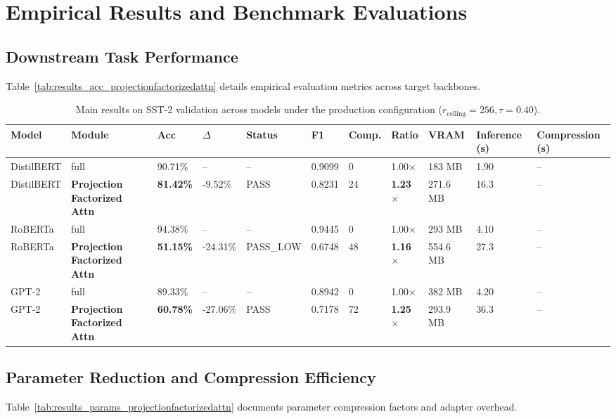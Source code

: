 \section{Empirical Results and Benchmark Evaluations}

\subsection{Downstream Task Performance}
Table~\ref{tab:results_acc_projectionfactorizedattn} details empirical evaluation metrics across target backbones.

\begin{table}[t]
\centering
\small
\begin{tabular}{lllllllllll}
\toprule
\textbf{Model} & \textbf{Module} & \textbf{Acc} & \textbf{$\Delta$} & \textbf{Status} & \textbf{F1} & \textbf{Comp.} & \textbf{Ratio} & \textbf{VRAM} & \textbf{Inference (s)} & \textbf{Compression (s)} \\
\midrule
DistilBERT & full & 90.71\% & -- & -- & 0.9099 & 0 & 1.00$\times$ & 183 MB & 1.90 & -- \\
DistilBERT & \textbf{Projection Factorized Attn} & \textbf{81.42\%} & -9.52\% & PASS & 0.8231 & 24 & \textbf{1.23$\times$} & 271.6 MB & 16.3 & -- \\
RoBERTa & full & 94.38\% & -- & -- & 0.9445 & 0 & 1.00$\times$ & 293 MB & 4.10 & -- \\
RoBERTa & \textbf{Projection Factorized Attn} & \textbf{51.15\%} & -24.31\% & PASS_LOW & 0.6748 & 48 & \textbf{1.16$\times$} & 554.6 MB & 27.3 & -- \\
GPT-2 & full & 89.33\% & -- & -- & 0.8942 & 0 & 1.00$\times$ & 382 MB & 4.20 & -- \\
GPT-2 & \textbf{Projection Factorized Attn} & \textbf{60.78\%} & -27.06\% & PASS & 0.7178 & 72 & \textbf{1.25$\times$} & 293.9 MB & 36.3 & -- \\
\bottomrule
\end{tabular}
\caption{Main results on SST-2 validation across models under the production configuration ($r_{\mathrm{ceiling}}=256, \tau=0.40$).}
\label{tab:main_sst2}
\end{table}

\subsection{Parameter Reduction and Compression Efficiency}
Table~\ref{tab:results_params_projectionfactorizedattn} documents parameter compression factors and adapter overhead.

